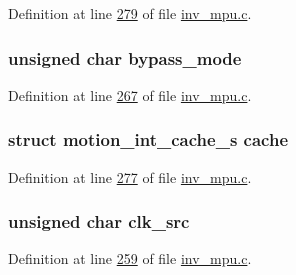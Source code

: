 Definition at line \hyperlink{inv__mpu_8c_source_l00279}{279} of file \hyperlink{inv__mpu_8c_source}{inv\+\_\+mpu.\+c}.

\subsubsection[{\texorpdfstring{bypass\+\_\+mode}{bypass_mode}}]{\setlength{\rightskip}{0pt plus 5cm}unsigned char bypass\+\_\+mode}\hypertarget{structchip__cfg__s_a2dd3f2719bc8ed1946811203ec330905}{}\label{structchip__cfg__s_a2dd3f2719bc8ed1946811203ec330905}


Definition at line \hyperlink{inv__mpu_8c_source_l00267}{267} of file \hyperlink{inv__mpu_8c_source}{inv\+\_\+mpu.\+c}.

\subsubsection[{\texorpdfstring{cache}{cache}}]{\setlength{\rightskip}{0pt plus 5cm}struct {\bf motion\+\_\+int\+\_\+cache\+\_\+s} cache}\hypertarget{structchip__cfg__s_aab21a113d97da9c015f6f1928662927b}{}\label{structchip__cfg__s_aab21a113d97da9c015f6f1928662927b}


Definition at line \hyperlink{inv__mpu_8c_source_l00277}{277} of file \hyperlink{inv__mpu_8c_source}{inv\+\_\+mpu.\+c}.

\subsubsection[{\texorpdfstring{clk\+\_\+src}{clk_src}}]{\setlength{\rightskip}{0pt plus 5cm}unsigned char clk\+\_\+src}\hypertarget{structchip__cfg__s_a2ac4d2f6d885669a21842e13dd3c5241}{}\label{structchip__cfg__s_a2ac4d2f6d885669a21842e13dd3c5241}


Definition at line \hyperlink{inv__mpu_8c_source_l00259}{259} of file \hyperlink{inv__mpu_8c_source}{inv\+\_\+mpu.\+c}.

